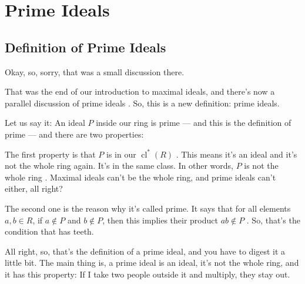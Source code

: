 \section{Prime Ideals}

\subsection{Definition of Prime Ideals}

\begin{speech}[00:47:51 - 00:49:27]
Okay, so, sorry, that was a small discussion there.

That was the end of our introduction to maximal ideals, and there's now a parallel discussion of prime ideals . So, this is a new definition: prime ideals.

Let us say it: An ideal $P$ inside our ring is prime  --- and this is the definition of prime  --- and there are two properties:

The first property is that $P$ is in our $\operatorname{cl}^*(R)$ . This means it's an ideal and it's not the whole ring again. It's in the same class. In other words, $P$ is not the whole ring . Maximal ideals can't be the whole ring, and prime ideals can't either, all right?

The second one is the reason why it's called prime. It says that for all elements $a, b \in R$, if $a \notin P$ and $b \notin P$, then this implies their product $ab \notin P$ . So, that's the condition that has teeth.

All right, so, that's the definition of a prime ideal, and you have to digest it a little bit. The main thing is, a prime ideal is an ideal, it's not the whole ring, and it has this property: If I take two people outside it and multiply, they stay out.
\end{speech}

